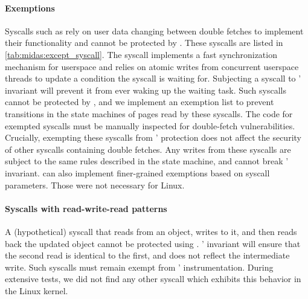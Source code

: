 \paragraph{Exemptions}
Syscalls such as  rely on user data changing between double
fetches to implement their functionality and cannot be protected by
\midas.
These syscalls are listed in \autoref{tab:midas:except_syscall}.
The  syscall implements a fast synchronization mechanism
for userspace and relies on atomic writes from concurrent userspace
threads to update a condition the syscall is waiting for.
Subjecting a  syscall to \midas' invariant will prevent
it from ever waking up the waiting task.
Such syscalls cannot be protected by \midas, and we implement an
exemption list to prevent transitions in the state machines of pages read
by these syscalls.
The code for exempted syscalls must be manually inspected for double-fetch
vulnerabilities.
Crucially, exempting these syscalls from \midas' protection does not
affect the security of other syscalls containing double fetches.
Any writes from these syscalls are subject to the same rules described
in the state machine, and cannot break \midas' invariant.
\midas can also implement finer-grained exemptions based on syscall
parameters. Those were not necessary for Linux.
%


\paragraph{Syscalls with read-write-read patterns}
A (hypothetical) syscall that reads from an object, writes to it, and
then reads back the updated object cannot be protected using \midas.
\midas' invariant will ensure that the second read is identical to the first,
and does not reflect the intermediate write.
Such syscalls must remain exempt from \midas' instrumentation.
During extensive tests, we did not find any other syscall which exhibits this behavior in the Linux
kernel.

